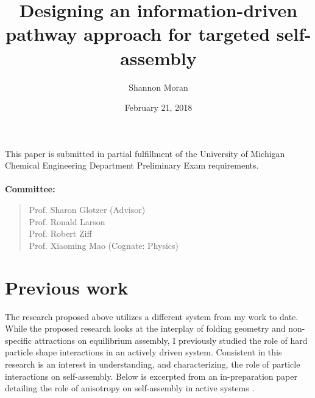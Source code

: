 \documentclass[11pt]{article}   	%
\title{Designing an information-driven pathway approach for targeted self-assembly}
\author{Shannon Moran}
\date{February 21, 2018}
\begin{document}
\maketitle
\thispagestyle{empty}
\noindent
This paper is submitted in partial fulfillment of the University of Michigan Chemical Engineering Department Preliminary Exam requirements.
\\ \\
\textbf{Committee:} 
\begin{quote} 
Prof. Sharon Glotzer (Advisor) \\ Prof. Ronald Larson \\ Prof. Robert Ziff \\ Prof. Xiaoming Mao (Cognate: Physics)
\end{quote}

\newpage
\thispagestyle{empty}


\newpage



\clearpage
\setcounter{page}{1}




%
%



%

%

\section{Previous work}

The research proposed above utilizes a different system from my work to date.
While the proposed research looks at the interplay of folding geometry and non-specific attractions on equilibrium assembly, I previously studied the role of hard particle shape interactions in an actively driven system. 
Consistent in this research is an interest in understanding, and characterizing, the role of particle interactions on self-assembly.
Below is excerpted from an in-preparation paper detailing the role of anisotropy on self-assembly in active systems \cite{Moran_2018_unpublished}. 
\end{document}
